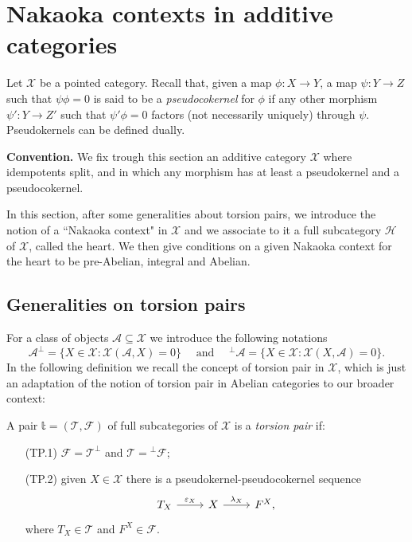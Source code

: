 \clearpage

\section{Nakaoka contexts in additive categories}

Let $\mathcal{X}$ be a pointed category. Recall that, given a map $\phi\colon X\to Y$, a map $\psi\colon Y\to Z$ such that $\psi\phi=0$ is said to be a {\em pseudocokernel} for $\phi$ if any other morphism $\psi'\colon Y\to Z'$ such that $\psi'\phi=0$ factors (not necessarily uniquely) through $\psi$. Pseudokernels can be defined dually.

\medskip\noindent
{\bf Convention.} We fix  trough this section an additive category $\mathcal{X}$ where  idempotents split, and in which any morphism has at least a pseudokernel and a pseudocokernel.

\medskip
In this section, after some generalities about torsion pairs, we introduce the notion of a ``Nakaoka context" in $\mathcal X$ and we associate to it a full subcategory $\mathcal H$ of $\mathcal X$, called the heart. We then give conditions on a given Nakaoka context for the heart to be pre-Abelian, integral and Abelian. 

\subsection{Generalities on torsion pairs}

For a class of objects $\mathcal A\subseteq \mathcal X$ we introduce the following notations
\[
\mathcal A^\perp = \{X\in\mathcal{X}:\mathcal{X}(\mathcal A,X)=0\}\quad \text{ and }\quad {^\perp\mathcal A} = \{X\in\mathcal{X}:\mathcal{X}(X,\mathcal A)=0\}.
\]
In the following definition we recall the concept of torsion pair in $\mathcal X$, which is just an adaptation of the notion of torsion pair in Abelian categories to our broader context:

\begin{definition}
A pair $\mathbb{t}=(\mathcal{T},\mathcal{F})$ of full subcategories of $\mathcal{X}$ is  a {\em torsion pair} if:
\begin{enumerate}
\item[\rm (TP.1)] $\mathcal{F}=\mathcal{T}^\perp$ and $\mathcal{T}={^\perp\mathcal{F}}$;
\item[\rm (TP.2)] given $X\in\mathcal{X}$ there is a pseudokernel-pseudocokernel sequence
\begin{equation*}
\begin{tikzcd}
T_X\arrow{r}{\varepsilon_X}& X\arrow{r}{\lambda_X}&F^X,
\end{tikzcd}
\end{equation*}
where $T_X\in\mathcal{T}$ and $F^X\in\mathcal{F}$.
\end{enumerate}
\end{definition}

